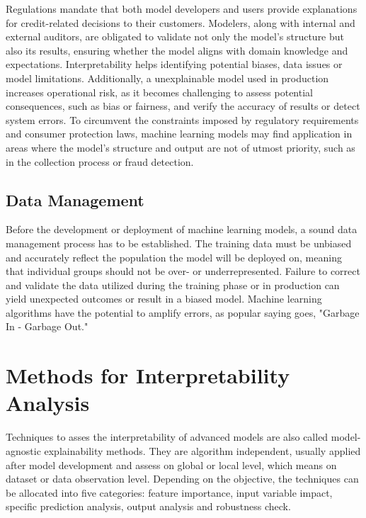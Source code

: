 Regulations mandate that both model developers and users provide explanations for credit-related decisions to their customers. Modelers, along with internal and external auditors, are obligated to validate not only the model's structure but also its results, ensuring whether the model aligns with domain knowledge and expectations. Interpretability helps identifying potential biases, data issues or model limitations. Additionally, a unexplainable model used in production increases operational risk, as it becomes challenging to assess potential consequences, such as bias or fairness, and verify the accuracy of results or detect system errors. To circumvent the constraints imposed by regulatory requirements and consumer protection laws, machine learning models may find application in areas where the model's structure and output are not of utmost priority, such as in the collection process or fraud detection. \cite[pp.~57, 58]{Roberts2022} \cite[p.~89]{Witzany:2017}

\subsection{Data Management}
Before the development or deployment of machine learning models, a sound data management process has to be established. The training data must be unbiased and accurately reflect the population the model will be deployed on, meaning that individual groups should not be over- or underrepresented. Failure to correct and validate the data utilized during the training phase or in production can yield unexpected outcomes or result in a biased model. Machine learning algorithms have the potential to amplify errors, as popular saying goes, "Garbage In - Garbage Out." \cite[p.~61]{Roberts2022}

\section{Methods for Interpretability Analysis}
Techniques to asses the interpretability of advanced models are also called model-agnostic explainability methods. They are algorithm independent, usually applied after model development and assess on global or local level, which means on dataset or data observation level. Depending on the objective, the techniques can be allocated into five categories: feature importance, input variable impact, specific prediction analysis, output analysis and robustness check. \cite[p.~62]{Roberts2022}

